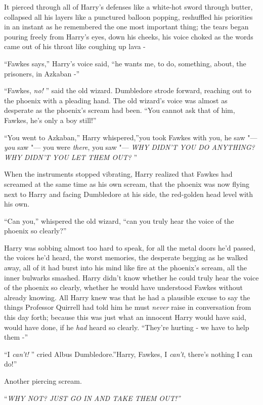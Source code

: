 It pierced through all of Harry's defenses like a white-hot sword
through butter, collapsed all his layers like a punctured balloon
popping, reshuffled his priorities in an instant as he remembered the
one most important thing; the tears began pouring freely from Harry's
eyes, down his cheeks, his voice choked as the words came out of his
throat like coughing up lava -

``Fawkes says,'' Harry's voice said, ``he wants me, to do, something,
about, the prisoners, in Azkaban -''

``Fawkes, \emph{no!} '' said the old wizard. Dumbledore strode forward,
reaching out to the phoenix with a pleading hand. The old wizard's voice
was almost as desperate as the phoenix's scream had been. ``You cannot
ask that of him, Fawkes, he's only a boy still!''

``You went to Azkaban,'' Harry whispered,''you took Fawkes with you, he
saw "--- \emph{you} saw "--- you were \emph{there}, you saw "--- \emph{WHY DIDN'T
YOU DO ANYTHING? WHY DIDN'T YOU LET THEM OUT?} ''

When the instruments stopped vibrating, Harry realized that Fawkes had
screamed at the same time as his own scream, that the phoenix was now
flying next to Harry and facing Dumbledore at his side, the red-golden
head level with his own.

``Can you,'' whispered the old wizard, ``can you truly hear the voice of
the phoenix so clearly?''

Harry was sobbing almost too hard to speak, for all the metal doors he'd
passed, the voices he'd heard, the worst memories, the desperate begging
as he walked away, all of it had burst into his mind like fire at the
phoenix's scream, all the inner bulwarks smashed. Harry didn't know
whether he could truly hear the voice of the phoenix so clearly, whether
he would have understood Fawkes without already knowing. All Harry knew
was that he had a plausible excuse to say the things Professor Quirrell
had told him he must \emph{never} raise in conversation from this day
forth; because this was just what an innocent Harry would have said,
would have done, if he \emph{had} heard so clearly. ``They're hurting -
we have to help them -''

``I \emph{can't!} '' cried Albus Dumbledore.''Harry, Fawkes, I
\emph{can't}, there's nothing I can do!''

Another piercing scream.

``\emph{WHY NOT? JUST GO IN AND TAKE THEM OUT!''}

